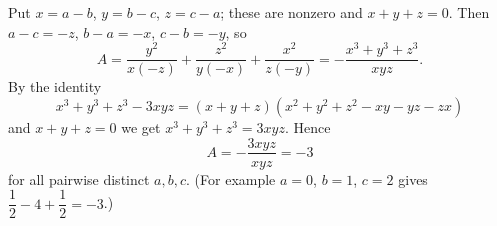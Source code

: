 Put $x=a-b$, $y=b-c$, $z=c-a$; these are nonzero and $x+y+z=0$. Then $a-c=-z$, $b-a=-x$, $c-b=-y$, so
\[
A=\dfrac{y^2}{x(-z)}+\dfrac{z^2}{y(-x)}+\dfrac{x^2}{z(-y)}=-\dfrac{x^3+y^3+z^3}{xyz}.
\]
By the identity
\[
x^3+y^3+z^3-3xyz=(x+y+z)(x^2+y^2+z^2-xy-yz-zx)
\]
and $x+y+z=0$ we get $x^3+y^3+z^3=3xyz$. Hence
\[
A=-\dfrac{3xyz}{xyz}=\boxed{-3}
\]
for all pairwise distinct $a,b,c$. (For example $a=0$, $b=1$, $c=2$ gives $\dfrac{1}{2}-4+\dfrac{1}{2}=-3$.)
